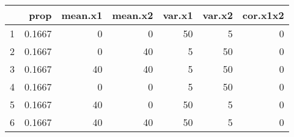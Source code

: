\begin{table}[ht]
\centering
\begin{tabular}{rrrrrrr}
  \hline
 & prop & mean.x1 & mean.x2 & var.x1 & var.x2 & cor.x1x2 \\ 
  \hline
1 & 0.1667 &     0 &     0 &    50 &     5 &     0 \\ 
  2 & 0.1667 &     0 &    40 &     5 &    50 &     0 \\ 
  3 & 0.1667 &    40 &    40 &     5 &    50 &     0 \\ 
  4 & 0.1667 &     0 &     0 &     5 &    50 &     0 \\ 
  5 & 0.1667 &    40 &     0 &    50 &     5 &     0 \\ 
  6 & 0.1667 &    40 &    40 &    50 &     5 &     0 \\ 
   \hline
\end{tabular}
\end{table}
